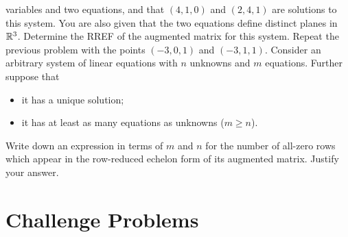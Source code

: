 \begin{tasks}[resume, style=enumerate]
  variables and two equations, and that $(4, 1, 0)$ and $(2, 4, 1)$
  are solutions to this system.  You are also given that the two
  equations define distinct planes in $\mathbb R^3$.  Determine the
  RREF of the augmented matrix for this system.
\task
  Repeat the previous problem with the points $(-3, 0, 1)$ and $(-3,
  1, 1)$.
\task
  Consider an arbitrary system of linear equations with $n$ unknowns
  and $m$ equations.  Further suppose that
  \begin{itemize}
  \item
    it has a unique solution;
  \item
    it has at least as many equations as unknowns ($m \geq n$).
  \end{itemize}
  Write down an expression in terms of $m$ and $n$ for the number of
  all-zero rows which appear in the row-reduced echelon form of its
  augmented matrix.  Justify your answer.
\end{tasks}

\section{Challenge Problems}

